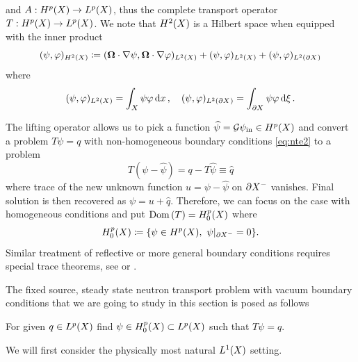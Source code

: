 %
and $A : \Hp(X) \to \Lp(X)$, thus the complete transport operator \linebreak\mbox{$T: \Hp(X) \to \Lp(X)$}.
We note that $\Hp[2](X)$ is a Hilbert space when equipped with the inner product
\begin{equation*}\label{eq:ip}
	\ip{\Hp[2](X)}{\psi,\varphi} \coloneqq \ip{\Lp[2](X)}{\bomega\cdot\nabla \psi, \bomega\cdot\nabla \varphi} +
	\ip{\Lp[2](X)}{\psi,\varphi} +
	\ip{\Lp[2](\pX)}{\psi,\varphi} 	
\end{equation*}
where
\begin{equation}\label{eq:ipL2}
	\ip{\Lp[2](X)}{\psi,\varphi} = \int_X \psi \varphi \,\d{x},\quad
	\ip{\Lp[2](\pX)}{\psi,\varphi} = \int_{\pX} \psi \varphi \,\d{\xi}.
\end{equation}


The lifting operator allows us to pick a function $\widehat \psi = \mathcal{G}\psi_{\text{in}} \in \Hp(X)$ and convert a
problem $T\psi = q$ with non-homogeneous boundary conditions \eqref{eq:nte2} to a problem 
$$
	T(\psi - \widehat\psi) = q - T\widehat\psi \equiv \widehat q
$$ 
where trace of the new unknown function $u = \psi - \widehat\psi$ on $\pX[-]$ vanishes. Final solution is then recovered
as $\psi = u + \widehat{q}$. Therefore, we can focus on the case with homogeneous conditions and put $\Dom{T} =
\Hpnot(X)$ where
$$
	\Hpnot(X) \coloneqq \{\psi\in \Hp(X),\ \psi\vert_{\pX[-]} = 0\}.
$$
Similar treatment of reflective or more general boundary conditions requires special trace theorems, see
\cite[Chap. XXI, Appendix of \S2]{DautrayLions} or \cite[Chap. 2]{Agoshkov}.

The fixed source, steady state neutron transport problem with vacuum boundary conditions that we are going to study in
this section is posed as follows

\begin{problem}\label{prb:1}
For given $q\in \Lp(X)$ find $\psi \in \Hpnot(X) \subset \Lp(X)$ such that
$
     T\psi = q.
$
\end{problem}


We will first consider the physically most natural $\Lp[1](X)$ setting.

